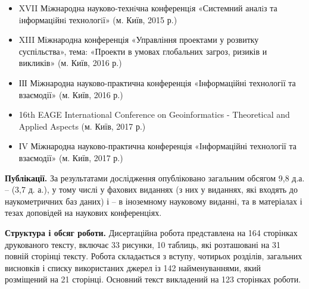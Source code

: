 \begin{itemize}
	\item XVII Мiжнародна науково-технiчна конференцiя «Системний аналiз та iнформацiйнi технологiї» (м. Київ, 2015 р.)
	\item XIII Міжнародна конференція «Управління проектами у розвитку суспільства», тема: «Проекти в умовах глобальних загроз, ризиків и викликів» (м. Київ, 2016 р.)
	\item ІІІ Міжнародна науково-практична конференція «Інформаційні технології та взаємодії» (м. Київ, 2016 р.)
	\item 16th EAGE International Conference on Geoinformatics - Theoretical and Applied Aspects (м. Київ, 2017 р.)
	\item ІV Міжнародна науково-практична конференція «Інформаційні технології та взаємодії» (м. Київ, 2017 р.)
\end{itemize}

\printbibliography[heading=countauthor, env=countauthor, keyword=biblioauthor, section=1]%
\printbibliography[heading=countauthorpaper, env=countauthorpaper, keyword=biblioauthor, notkeyword=biblioauthorconf, section=1]%
\printbibliography[heading=countauthorvak, env=countauthorvak, keyword=biblioauthorvak, section=1]%
\printbibliography[heading=countauthorindexed, env=countauthorindexed, keyword=biblioauthorvak, category=biblioauthoreng, section=1]%
\printbibliography[heading=countauthorconf, env=countauthorconf, keyword=biblioauthorconf, section=1]%
\printbibliography[heading=countauthornotvak, env=countauthornotvak, keyword=biblioauthornotvak, section=1]%
\printbibliography[heading=countauthoreng, env=countauthoreng, notkeyword=biblioauthorvak, category=biblioauthoreng, section=1]%

\textbf{Публікації.} 
За результатами дослідження опубліковано 
 загальним обсягом 9,8 д.а. – 
 (3,7 д. а.), у тому числі 
 у фахових виданнях (з них 
 у виданнях, які входять до наукометричних баз даних) і 
 – в іноземному науковому виданні, та 
 в матеріалах і тезах доповідей на наукових конференціях.

\ifsynopsis

\textbf{Структура і обсяг роботи.} Дисертаційна робота представлена на 164 сторінках друкованого тексту, включає 33 рисунки, 10 таблиць, які розташовані на 31 повній сторінці тексту. Робота складається з вступу, чотирьох розділів, загальних висновків і списку використаних джерел із 142 найменуваннями, який розміщений на 21 сторінці. Основний текст викладений на 123 сторінках роботи.

